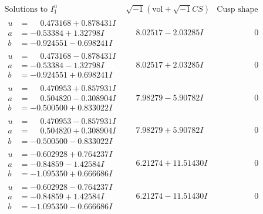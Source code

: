 \documentclass[1p]{elsarticle_modified}
\theoremstyle{definition}
\newcommand{\I}{\sqrt{-1}}
\begin{document}
$$\begin{array}{c|c|c}  
\text{Solutions to }I^u_{1}& \I (\text{vol} + \sqrt{-1}CS) & \text{Cusp shape}\\
 \hline 
\begin{aligned}
u &= \phantom{-}0.473168 + 0.878431 I \\
a &= -0.53384 + 1.32798 I \\
b &= -0.924551 - 0.698241 I\end{aligned}
 & \phantom{-}8.02517 - 2.03285 I & \phantom{-0.000000 } 0 \\ \hline\begin{aligned}
u &= \phantom{-}0.473168 - 0.878431 I \\
a &= -0.53384 - 1.32798 I \\
b &= -0.924551 + 0.698241 I\end{aligned}
 & \phantom{-}8.02517 + 2.03285 I & \phantom{-0.000000 } 0 \\ \hline\begin{aligned}
u &= \phantom{-}0.470953 + 0.857931 I \\
a &= \phantom{-}0.504820 - 0.308904 I \\
b &= -0.500500 + 0.833022 I\end{aligned}
 & \phantom{-}7.98279 - 5.90782 I & \phantom{-0.000000 } 0 \\ \hline\begin{aligned}
u &= \phantom{-}0.470953 - 0.857931 I \\
a &= \phantom{-}0.504820 + 0.308904 I \\
b &= -0.500500 - 0.833022 I\end{aligned}
 & \phantom{-}7.98279 + 5.90782 I & \phantom{-0.000000 } 0 \\ \hline\begin{aligned}
u &= -0.602928 + 0.764237 I \\
a &= -0.84859 - 1.42584 I \\
b &= -1.095350 + 0.666686 I\end{aligned}
 & \phantom{-}6.21274 + 11.51430 I & \phantom{-0.000000 } 0 \\ \hline\begin{aligned}
u &= -0.602928 - 0.764237 I \\
a &= -0.84859 + 1.42584 I \\
b &= -1.095350 - 0.666686 I\end{aligned}
 & \phantom{-}6.21274 - 11.51430 I & \phantom{-0.000000 } 0 \\ \hline\begin{aligned}

\end{aligned}
\end{array}$$
\end{document}
